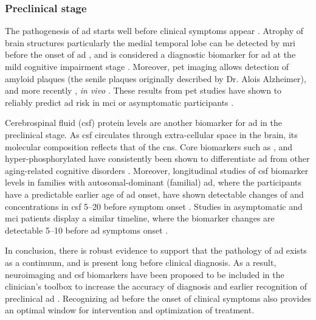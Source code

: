 \subsubsection{Preclinical stage \label{preclinical}}

The pathogenesis of \gls{ad} starts well before clinical symptoms appear \citep{dubois16}. Atrophy of brain structures particularly the medial temporal lobe can be detected by \gls{mri} before the onset of \gls{ad} \citep{jack92, scheltens92, chetelat03}, and is considered a diagnostic biomarker for \gls{ad} at the mild cognitive impairment stage \citep{jack99}. Moreover, \gls{pet} imaging allows detection of amyloid plaques (the senile plaques originally described by Dr. Alois Alzheimer), and more recently \atau{} , \textit{in vivo} \citep{mathis03, maruyama13, okamura13}. These results from \gls{pet} studies have shown to reliably predict \gls{ad} risk in \gls{mci} or asymptomatic participants \citep{klunk04, chien14, sepulcre16}.

Cerebrospinal fluid (\gls{csf}) protein levels are another biomarker for \gls{ad} in the preclinical stage. As \gls{csf} circulates through extra-cellular space in the brain, its molecular composition reflects that of the \gls{cns}. Core biomarkers such as \abeta{}, \atau{} and hyper-phosphorylated \atau{} have consistently been shown to differentiate \gls{ad} from other aging-related cognitive disorders \citep{blennow10}. Moreover, longitudinal studies of \gls{csf} biomarker levels in families with autosomal-dominant (familial) \gls{ad}, where the participants have a predictable earlier age of \gls{ad} onset, have shown detectable changes of \abeta{} and \atau{} concentrations in \gls{csf} \SIrange{5}{20}{\year} before symptom onset \citep{bateman12, fagan14}. Studies in asymptomatic and \gls{mci} patients display a similar timeline, where the biomarker changes are detectable \SIrange{5}{10}{\year} before \gls{ad} symptoms onset \citep{buchhave12, vos13}. 

In conclusion, there is robust evidence to support that the pathology of \gls{ad} exists as a continuum, and is present long before clinical diagnosis. As a result, neuroimaging and \gls{csf} biomarkers have been proposed to be included in the clinician's toolbox to increase the accuracy of diagnosis and earlier recognition of preclinical \gls{ad} \citep{ad16}. Recognizing \gls{ad} before the onset of clinical symptoms also provides an optimal window for intervention and optimization of treatment. 


